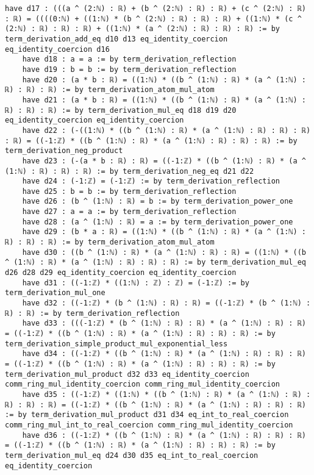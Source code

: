 \documentclass{article}
\begin{document}
\begin{tcolorbox}[colback=white!10, width=\linewidth]
\begin{lstlisting}[language=Lean4]
    have d17 : (((a ^ (2:ℕ) : ℝ) + (b ^ (2:ℕ) : ℝ) : ℝ) + (c ^ (2:ℕ) : ℝ) : ℝ) = ((((0:ℕ) + ((1:ℕ) * (b ^ (2:ℕ) : ℝ) : ℝ) : ℝ) + ((1:ℕ) * (c ^ (2:ℕ) : ℝ) : ℝ) : ℝ) + ((1:ℕ) * (a ^ (2:ℕ) : ℝ) : ℝ) : ℝ) := by term_derivation_add_eq d10 d13 eq_identity_coercion eq_identity_coercion d16
    have d18 : a = a := by term_derivation_reflection
    have d19 : b = b := by term_derivation_reflection
    have d20 : (a * b : ℝ) = ((1:ℕ) * ((b ^ (1:ℕ) : ℝ) * (a ^ (1:ℕ) : ℝ) : ℝ) : ℝ) := by term_derivation_atom_mul_atom
    have d21 : (a * b : ℝ) = ((1:ℕ) * ((b ^ (1:ℕ) : ℝ) * (a ^ (1:ℕ) : ℝ) : ℝ) : ℝ) := by term_derivation_mul_eq d18 d19 d20 eq_identity_coercion eq_identity_coercion
    have d22 : (-((1:ℕ) * ((b ^ (1:ℕ) : ℝ) * (a ^ (1:ℕ) : ℝ) : ℝ) : ℝ) : ℝ) = ((-1:ℤ) * ((b ^ (1:ℕ) : ℝ) * (a ^ (1:ℕ) : ℝ) : ℝ) : ℝ) := by term_derivation_neg_product
    have d23 : (-(a * b : ℝ) : ℝ) = ((-1:ℤ) * ((b ^ (1:ℕ) : ℝ) * (a ^ (1:ℕ) : ℝ) : ℝ) : ℝ) := by term_derivation_neg_eq d21 d22
    have d24 : (-1:ℤ) = (-1:ℤ) := by term_derivation_reflection
    have d25 : b = b := by term_derivation_reflection
    have d26 : (b ^ (1:ℕ) : ℝ) = b := by term_derivation_power_one
    have d27 : a = a := by term_derivation_reflection
    have d28 : (a ^ (1:ℕ) : ℝ) = a := by term_derivation_power_one
    have d29 : (b * a : ℝ) = ((1:ℕ) * ((b ^ (1:ℕ) : ℝ) * (a ^ (1:ℕ) : ℝ) : ℝ) : ℝ) := by term_derivation_atom_mul_atom
    have d30 : ((b ^ (1:ℕ) : ℝ) * (a ^ (1:ℕ) : ℝ) : ℝ) = ((1:ℕ) * ((b ^ (1:ℕ) : ℝ) * (a ^ (1:ℕ) : ℝ) : ℝ) : ℝ) := by term_derivation_mul_eq d26 d28 d29 eq_identity_coercion eq_identity_coercion
    have d31 : ((-1:ℤ) * ((1:ℕ) : ℤ) : ℤ) = (-1:ℤ) := by term_derivation_mul_one
    have d32 : ((-1:ℤ) * (b ^ (1:ℕ) : ℝ) : ℝ) = ((-1:ℤ) * (b ^ (1:ℕ) : ℝ) : ℝ) := by term_derivation_reflection
    have d33 : (((-1:ℤ) * (b ^ (1:ℕ) : ℝ) : ℝ) * (a ^ (1:ℕ) : ℝ) : ℝ) = ((-1:ℤ) * ((b ^ (1:ℕ) : ℝ) * (a ^ (1:ℕ) : ℝ) : ℝ) : ℝ) := by term_derivation_simple_product_mul_exponential_less
    have d34 : ((-1:ℤ) * ((b ^ (1:ℕ) : ℝ) * (a ^ (1:ℕ) : ℝ) : ℝ) : ℝ) = ((-1:ℤ) * ((b ^ (1:ℕ) : ℝ) * (a ^ (1:ℕ) : ℝ) : ℝ) : ℝ) := by term_derivation_mul_product d32 d33 eq_identity_coercion comm_ring_mul_identity_coercion comm_ring_mul_identity_coercion
    have d35 : ((-1:ℤ) * ((1:ℕ) * ((b ^ (1:ℕ) : ℝ) * (a ^ (1:ℕ) : ℝ) : ℝ) : ℝ) : ℝ) = ((-1:ℤ) * ((b ^ (1:ℕ) : ℝ) * (a ^ (1:ℕ) : ℝ) : ℝ) : ℝ) := by term_derivation_mul_product d31 d34 eq_int_to_real_coercion comm_ring_mul_int_to_real_coercion comm_ring_mul_identity_coercion
    have d36 : ((-1:ℤ) * ((b ^ (1:ℕ) : ℝ) * (a ^ (1:ℕ) : ℝ) : ℝ) : ℝ) = ((-1:ℤ) * ((b ^ (1:ℕ) : ℝ) * (a ^ (1:ℕ) : ℝ) : ℝ) : ℝ) := by term_derivation_mul_eq d24 d30 d35 eq_int_to_real_coercion eq_identity_coercion

\end{lstlisting}
\end{tcolorbox}
\end{document}
